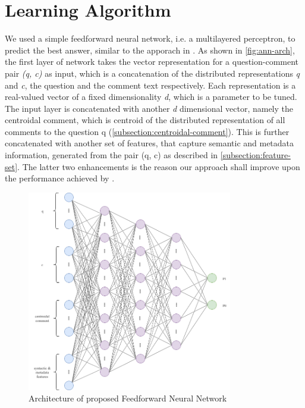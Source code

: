 \documentclass[12pt, a4paper, oneside]{Thesis} %
\begin{document}
\section{Learning Algorithm}
\label{section:learning-algo}

We used a simple feedforward neural network, i.e. a multilayered perceptron, to predict the best answer, similar to the apporach in \cite{bogdanova2016we}. As shown in \autoref{fig:ann-arch}, the first layer of network takes the vector representation for a question-comment pair \textit{(q, c)} as input, which is a concatenation of the distributed representations \textit{q} and \textit{c}, the question and the comment text respectively. Each representation is a real-valued vector of a fixed dimensionality \textit{d}, which is a parameter to be tuned. The input layer is concatenated with another \textit{d} dimensional vector, namely the centroidal comment, which is centroid of the distributed representation of all comments to the question q (\autoref{subsection:centroidal-comment}). This is further concatenated with another set of features, that capture semantic and metadata information, generated from the pair (q, c) as described in \autoref{subsection:feature-set}. The latter two enhancements is the reason our approach shall improve upon the performance achieved by \cite{bogdanova2016we}.

\begin{figure}[t!]
  \centering
  \includegraphics[keepaspectratio, width=0.8\textwidth]{./Pictures/ann-arch.png}
  \caption{Architecture of proposed Feedforward Neural Network}
  \label{fig:ann-arch}
\end{figure}
\end{document}
